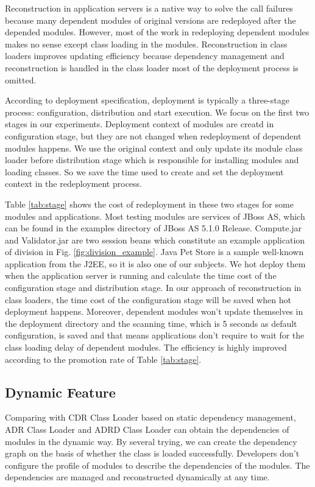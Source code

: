 \documentclass[conference]{IEEEtran}
\begin{document}
Reconstruction in application servers is a native way to solve the call failures because many dependent modules of original versions are redeployed after the depended modules.
However, most of the work in redeploying dependent modules makes no sense except class loading in the modules.
Reconstruction in class loaders improves updating efficiency because dependency management and reconstruction is handled in the class loader most of the deployment process is omitted.

According to deployment specification\cite{jsr88}, deployment is typically a three-stage process: configuration, distribution and start execution.
We focus on the first two stages in our experiments.
Deployment context of modules are creatd in configuration stage, but they are not changed when redeployment of dependent modules happens.
We use the original context and only update its module class loader before distribution stage which is responsible for installing modules and loading classes.
So we save the time used to create and set the deployment context in the redeployment process.

Table \ref{tab:stage} shows the cost of redeployment in these two stages for some modules and applications.
Most testing modules are services of JBoss AS, which can be found in the examples directory of JBoss AS 5.1.0 Release.
Compute.jar and Validator.jar are two session beans which constitute an example application of division in Fig. \ref{fig:division_example}.
Java Pet Store\cite{java_pet_store} is a sample well-known application from the J2EE, so it is also one of our subjects.
We hot deploy them when the application server is running and calculate the time cost of the configuration stage and distribution stage.
In our approach of reconstruction in class loaders, the time cost of the configuration stage will be saved when hot deployment happens.
Moreover, dependent modules won't update themselves in the deployment directory and the scanning time, which is 5 seconds as default configuration, is saved and that means applications don't require to wait for the class loading delay of dependent modules. 
The efficiency is highly improved according to the promotion rate of Table \ref{tab:stage}.


\subsection{Dynamic Feature}
Comparing with CDR Class Loader based on static dependency management, ADR Class Loader and ADRD Class Loader can obtain the dependencies of modules in the dynamic way.
By several trying, we can create the dependency graph on the basis of whether the class is loaded successfully.
Developers don't configure the profile of modules to describe the dependencies of the modules.
The dependencies are managed and reconstructed dynamically at any time.
\end{document}
